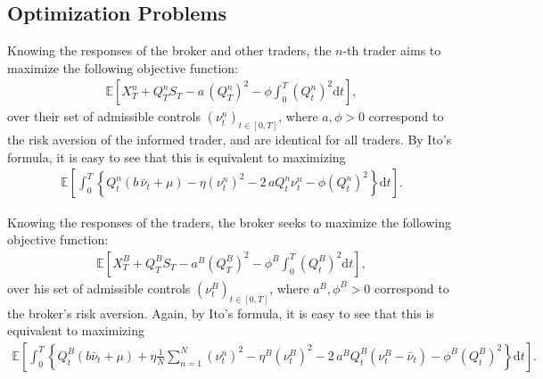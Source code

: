 \documentclass[10pt]{article}
\def\d{\mathrm{d}}
\begin{document}

\subsection{Optimization Problems}\label{subsec_Model_Players}


Knowing the responses of the broker and other traders, the $n$-th trader aims to maximize the following objective function:
\begin{align*}
\mathbb{E} \left[ X^n_T + Q^n_T S_T - a\,\left( Q^n_T \right)^2 - \phi \int_0^T \left( Q^n_t \right)^2 \d t \right],
\end{align*}
over their set of admissible controls $(\nu^n_t)_{t \in [0,T]}$, where  $a,\phi > 0$ correspond to the risk aversion of the informed trader, and are identical for all traders.
By Ito's formula, it is easy to see that this is equivalent to maximizing
\begin{align}\label{model_setting_and_main_conclusion:tradersproblem}
\mathbb{E} \left[ \int_0^T \left\{ Q^n_t \left(b\,\bar \nu_t + \mu \right) - \eta \left( \nu^n_t \right)^2 - 2\,a Q^n_t \nu^n_t - \phi \left( Q^n_t \right)^2 \right\} \d t \right].
\end{align}

Knowing the responses of the traders, the broker seeks to maximize the following objective function:
\begin{align*}
\mathbb{E} \left[ X^B_T + Q^B_T S_T - a^B\left(Q^B_T\right)^2 - \phi^B \int_0^T \left( Q^B_t \right)^2 \d t \right],
\end{align*}
over his set of admissible controls $(\nu^B_t)_{t \in [0,T]}$, where $a^B, \phi^B > 0$ correspond to the broker's risk aversion.
Again, by Ito's formula, it is easy to see that this is equivalent to maximizing
\begin{align}\label{model_setting_and_main_conclusion:brokersproblem}
\mathbb{E} \left[ \int_0^T \left\{ Q^B_t \left(b \bar \nu_t + \mu \right) + \eta \frac{1}{N} \sum_{n=1}^N \left(\nu^n_t \right)^2 - \eta^B \left( \nu^B_t \right)^2 - 2\,a^B Q^B_t \left( \nu^B_t - \bar \nu_t \right) - \phi^B \left( Q^B_t \right)^2 \right\} \d t \right].
\end{align}
\end{document}
